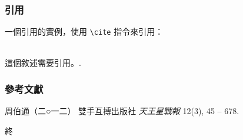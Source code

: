 \documentclass{beamer}
\begin{document}

\begin{frame}[fragile] %
\frametitle{\iyan 引用}
一個引用的實例，使用 \verb|\cite| 指令來引用：\\~

這個敘述需要引用。\cite{p1}.
\end{frame}


\begin{frame}
\frametitle{\iyan 參考文獻}
\footnotesize{
\begin{thebibliography}{99} %
 周伯通（二○一二）
\newblock 雙手互搏出版社
\newblock \emph{天王星戰報} 12(3), 45 -- 678.
\end{thebibliography}
}
\end{frame}


\begin{frame}
\Huge{\centerline{\iyan 終}}
\end{frame}

\end{document}
